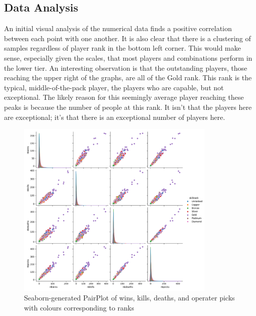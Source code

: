 \documentclass[12pt]{article}
\begin{document}
\subsection{Data Analysis}
An initial visual analysis of the numerical data finds a positive correlation between each point with one another.
It is also clear that there is a clustering of samples regardless of player rank in the bottom left corner.
This would make sense, especially given the scales, that most players and combinations perform in the lower tier.
An interesting observation is that the outstanding players, those reaching the upper right of the graphs, are all of the Gold rank.
This rank is the typical, middle-of-the-pack player, the players who are capable, but not exceptional.
The likely reason for this seemingly average player reaching these peaks is because the number of people at this rank.
It isn't that the players here are exceptional; it's that there is an exceptional number of players here.
\begin{figure}[H]
	\centering
	\includegraphics[width=0.85\textwidth]{wins-kills-deaths-picks-pairplot}
	\caption{Seaborn-generated PairPlot of wins, kills, deaths, and operater picks with colours corresponding to ranks}
	\label{fig:pairplot}
\end{figure}
\end{document}
